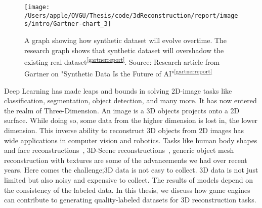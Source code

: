 \begin{figure}
    \centering
    \texttt{[image: /Users/apple/OVGU/Thesis/code/3dReconstruction/report/images/intro/Gartner-chart\_3]}
    \caption[Evolution of Synthetic Datasets Over Time.]{A graph showing how synthetic dataset will evolve overtime. The research graph shows that synthetic dataset will overshadow the existing real dataset\textsuperscript{\ref{gartnerreport}}.
    Source: Research article from Gartner on "Synthetic Data Is the Future of AI"\textsuperscript{\ref{gartnerreport}}}
    \label{fig:Gartner research on synthetic dataset}
\end{figure}
%

Deep Learning has made leaps and bounds in solving 2D-image tasks like classification, segmentation, object detection, and many more.
It has now entered the realm of Three-Dimension.
An image is a 3D objects projects onto a 2D surface.
While doing so, some data from the higher dimension is lost in, the lower dimension.
This inverse ability to reconstruct 3D objects from 2D images has wide applications in computer vision and robotics.
Tasks like human body shapes and face reconstructions~\cite{deng2019accurate,Guo20193DFace,Afzal2020,Richardson2016,Richardson2017LearningDF},
3D-Scene reconstructions~\cite{Denninger20203DSR,Song2017SemanticSC,Li2019,Shin20193DSR},
generic object mesh reconstruction with textures are some of the advancements we had over recent years.
Here comes the challenge;3D data is not easy to collect.
3D data is not just limited but also noisy and expensive to collect.
The results of models depend on the consistency of the labeled data.
In this thesis, we discuss how game engines can contribute to generating quality-labeled datasets for 3D reconstruction tasks.


